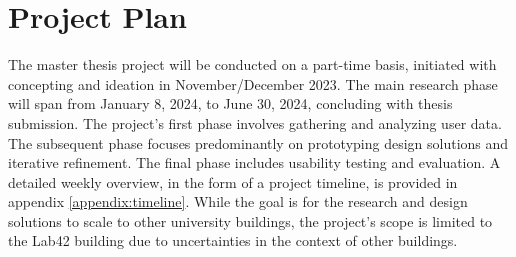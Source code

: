 \section{Project Plan}

The master thesis project will be conducted on a part-time basis, initiated with concepting and ideation in November/December 2023. The main research phase will span from January 8, 2024, to June 30, 2024, concluding with thesis submission. The project's first phase involves gathering and analyzing user data. The subsequent phase focuses predominantly on prototyping design solutions and iterative refinement. The final phase includes usability testing and evaluation. A detailed weekly overview, in the form of a project timeline, is provided in appendix \ref{appendix:timeline}. While the goal is for the research and design solutions to scale to other university buildings, the project's scope is limited to the Lab42 building due to uncertainties in the context of other buildings.
